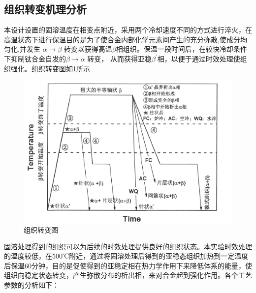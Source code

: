 \subsection{组织转变机理分析}
本设计设置的固溶温度在相变点附近，采用两个冷却速度不同的方式进行淬火，在高温状态下进行保温目的是为了使合金内部化学元素间产生的充分弥散,使成分均匀化,并发生 $\alpha\to\beta$ 转变以获得高温$ \beta $相组织。保温一段时间后，在较快冷却条件下抑制钛合金自发的$\beta\to \alpha$ 转变， 从而获得亚稳$ \beta^{\prime} $相，以便于通过时效处理使组织强化。组织转变图如\ref{fig: micchange}所示


\begin{figure}[h!]
	\centering
	\includegraphics[width=0.7\linewidth]{pic/组织转变图}
	\caption{组织转变图}
	\label{fig: micchange}
\end{figure}


固溶处理得到的组织可以为后续的时效处理提供良好的组织状态。本实验时效处理的温度较低，在500℃附近，通过将固溶处理后得到的亚稳态组织加热到一定温度后保温60分钟，目的是促使得到的亚稳定相在热力学作用下来降低体系的能量，使组织向稳定状态转变，产生弥散分布的析出相，来对合金起到强化作用。各个工艺参数的分析如下：

